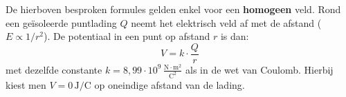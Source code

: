 \documentclass{ximera}
\begin{document}
\begin{remark}[expandable=true,title={Extra: potentiaal rond een puntlading}]\nl
De hierboven besproken formules gelden enkel voor een \textbf{homogeen} veld. Rond een geïsoleerde puntlading $Q$ neemt het elektrisch veld af met de afstand ($E \propto 1/r^2$). De potentiaal in een punt op afstand $r$ is dan:
\[
    V = k \cdot \frac{Q}{r}
\]
met dezelfde constante $k = 8{,}99 \cdot 10^{9} \, \mathrm{\frac{N \cdot m^2}{C^2}}$ als in de wet van Coulomb. Hierbij kiest men $V = 0 \, \mathrm{J/C}$ op oneindige afstand van de lading.
\end{remark}
\end{document}
